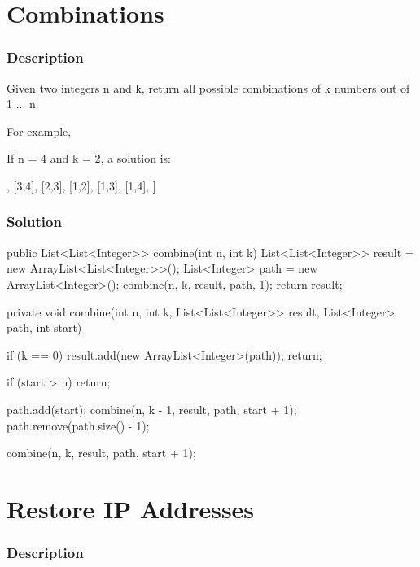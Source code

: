 \newpage

\section{Combinations} %

\subsubsection{Description}

Given two integers n and k, return all possible combinations of k numbers out of 1 ... n.

For example,

If n = 4 and k = 2, a solution is:
\begin{Code}
[
  [2,4],
  [3,4],
  [2,3],
  [1,2],
  [1,3],
  [1,4],
]
\end{Code}

\subsubsection{Solution}

\begin{Code}
public List<List<Integer>> combine(int n, int k) {
    List<List<Integer>> result = new ArrayList<List<Integer>>();
    List<Integer> path = new ArrayList<Integer>();
    combine(n, k, result, path, 1);
    return result;
}

private void combine(int n, int k, List<List<Integer>> result, List<Integer> path, int start) {
    if (k == 0) {
        result.add(new ArrayList<Integer>(path));
        return;
    }

    if (start > n) {
        return;
    }

    path.add(start);
    combine(n, k - 1, result, path, start + 1);
    path.remove(path.size() - 1);

    combine(n, k, result, path, start + 1);
}
\end{Code}

\newpage

\section{Restore IP Addresses} %

\subsubsection{Description}

